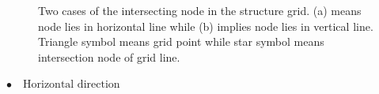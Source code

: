 \documentclass{article}
\begin{document}
\begin{figure}[hbpt!]
    \centering
    \caption{Two cases of the intersecting node in the structure grid. (a) means node lies in horizontal line while (b) implies node lies in vertical line. Triangle symbol means grid point while star symbol means intersection node of grid line. }
    \label{fig:enter-label}
\end{figure}
\noindent
$\bullet \quad \text{Horizontal direction}$
\end{document}
